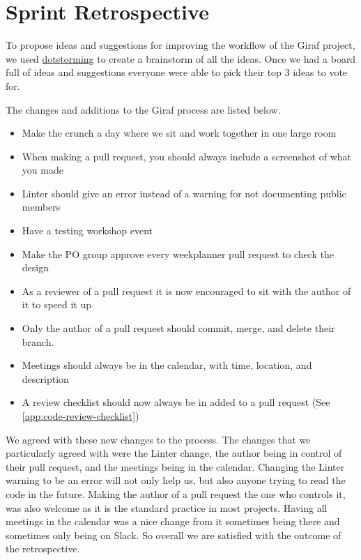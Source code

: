 \section{Sprint Retrospective}
To propose ideas and suggestions for improving the workflow of the Giraf project, we used \href{https://dotstorming.com/}{dotstorming} to create a brainstorm of all the ideas. 
Once we had a board full of ideas and suggestions everyone were able to pick their top 3 ideas to vote for.

The changes and additions to the Giraf process are listed below.

\begin{itemize}
  \item Make the crunch a day where we sit and work together in one large room
  \item When making a pull request, you should always include a screenshot of what you made
  \item Linter should give an error instead of a warning for not documenting public members
  \item Have a testing workshop event
  \item Make the PO group approve every weekplanner pull request to check the design
  \item As a reviewer of a pull request it is now encouraged to sit with the author of it to speed it up
  \item Only the author of a pull request should commit, merge, and delete their branch.
  \item Meetings should always be in the calendar, with time, location, and description
  \item A review checklist should now always be in added to a pull request (See \autoref{app:code-review-checklist})
\end{itemize}

We agreed with these new changes to the process.
The changes that we particularly agreed with were the Linter change, the author being in control of their pull request, and the meetings being in the calendar.
Changing the Linter warning to be an error will not only help us, but also anyone trying to read the code in the future.
Making the author of a pull request the one who controls it, was also welcome as it is the standard practice in most projects.
Having all meetings in the calendar was a nice change from it sometimes being there and sometimes only being on Slack.
So overall we are satisfied with the outcome of the retrospective.
